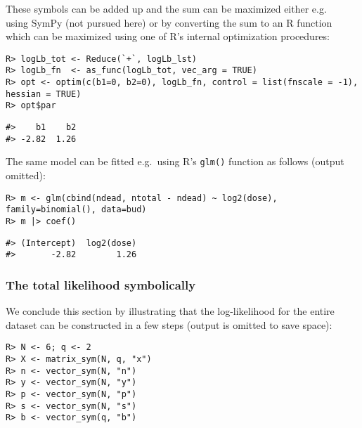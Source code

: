 These
symbols can be added up and the sum can be maximized either e.g.\\
using SymPy (not pursued here) or by converting the sum to an R
function which can be maximized using one of R's internal
optimization procedures:

\begin{verbatim}
R> logLb_tot <- Reduce(`+`, logLb_lst) 
R> logLb_fn  <- as_func(logLb_tot, vec_arg = TRUE)
R> opt <- optim(c(b1=0, b2=0), logLb_fn, control = list(fnscale = -1), hessian = TRUE)
R> opt$par
\end{verbatim}

\begin{verbatim}
#>    b1    b2 
#> -2.82  1.26
\end{verbatim}

The same model can be fitted e.g.~using R's \texttt{glm()} function as follows (output omitted):

\begin{verbatim}
R> m <- glm(cbind(ndead, ntotal - ndead) ~ log2(dose), family=binomial(), data=bud)
R> m |> coef()
\end{verbatim}

\begin{verbatim}
#> (Intercept)  log2(dose) 
#>       -2.82        1.26
\end{verbatim}

\hypertarget{the-total-likelihood-symbolically}{%
\subsubsection{The total likelihood symbolically}\label{the-total-likelihood-symbolically}}

We conclude this section by illustrating that the log-likelihood for the entire dataset
can be constructed in a few steps (output is omitted to save space):

\begin{verbatim}
R> N <- 6; q <- 2
R> X <- matrix_sym(N, q, "x")
R> n <- vector_sym(N, "n")
R> y <- vector_sym(N, "y")
R> p <- vector_sym(N, "p")
R> s <- vector_sym(N, "s")
R> b <- vector_sym(q, "b")
\end{verbatim}

